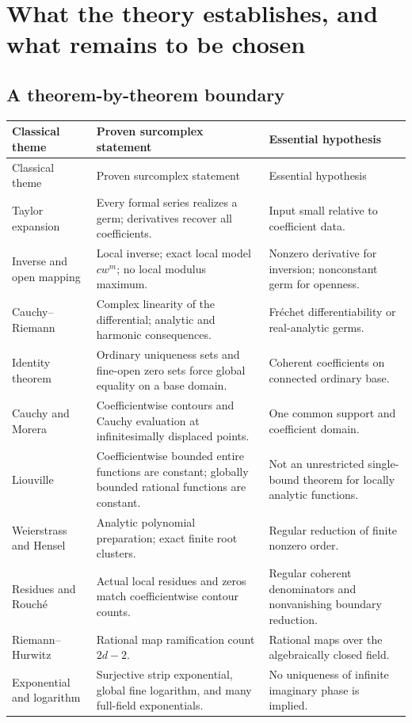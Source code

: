 \documentclass[11pt,a4paper]{article}
\numberwithin{equation}{section}
\theoremstyle{definition}
\theoremstyle{remark}
\begin{document}
\section{What the theory establishes, and what remains to be chosen}
\label{sec:scope}
\subsection{A theorem-by-theorem boundary}
\begingroup\small
\begin{longtable}{@{}>{\raggedright\arraybackslash}p{}>{\raggedright\arraybackslash}p{}>{\raggedright\arraybackslash}p{}@{}}
\toprule
Classical theme & Proven surcomplex statement & Essential hypothesis \\
\midrule
\endfirsthead
\toprule
Classical theme & Proven surcomplex statement & Essential hypothesis \\
\midrule
\endhead
Taylor expansion & Every formal series realizes a germ; derivatives recover all coefficients. & Input small relative to coefficient data. \\
\addlinespace[3pt]
Inverse and open mapping & Local inverse; exact local model $cw^m$; no local modulus maximum. & Nonzero derivative for inversion; nonconstant germ for openness. \\
\addlinespace[3pt]
Cauchy--Riemann & Complex linearity of the differential; analytic and harmonic consequences. & Fr\'echet differentiability or real-analytic germs. \\
\addlinespace[3pt]
Identity theorem & Ordinary uniqueness sets and fine-open zero sets force global equality on a base domain. & Coherent coefficients on connected ordinary base. \\
\addlinespace[3pt]
Cauchy and Morera & Coefficientwise contours and Cauchy evaluation at infinitesimally displaced points. & One common support and coefficient domain. \\
\addlinespace[3pt]
Liouville & Coefficientwise bounded entire functions are constant; globally bounded rational functions are constant. & Not an unrestricted single-bound theorem for locally analytic functions. \\
\addlinespace[3pt]
Weierstrass and Hensel & Analytic polynomial preparation; exact finite root clusters. & Regular reduction of finite nonzero order. \\
\addlinespace[3pt]
Residues and Rouch\'e & Actual local residues and zeros match coefficientwise contour counts. & Regular coherent denominators and nonvanishing boundary reduction. \\
\addlinespace[3pt]
Riemann--Hurwitz & Rational map ramification count $2d-2$. & Rational maps over the algebraically closed field. \\
\addlinespace[3pt]
Exponential and logarithm & Surjective strip exponential, global fine logarithm, and many full-field exponentials. & No uniqueness of infinite imaginary phase is implied. \\
\bottomrule
\end{longtable}
\endgroup
\end{document}
